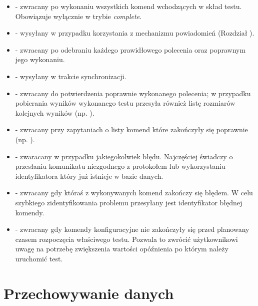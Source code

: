 \documentclass[00-praca-magisterska.tex]{subfiles}
\begin{document}
\begin{itemize}
  \setlength{\itemsep}{10pt}

\item{ - zwracany po wykonaniu wszystkich komend
wchodzących w skład testu. Obowiązuje wyłącznie w trybie \emph{complete}.}

\item{ - wysyłany w
przypadku korzystania z mechanizmu powiadomień (Rozdział ).}

\item{ - zwracany po odebraniu każdego prawidłowego polecenia oraz
poprawnym jego wykonaniu.}

\item{ - wysyłany w trakcie synchronizacji.}

\item{ - zwracany do potwierdzenia poprawnie wykonanego
polecenia; w przypadku pobierania wyników wykonanego testu przesyła również
listę rozmiarów kolejnych wyników (np. ).}

\item{ - zwracany przy zapytaniach o listy
komend które zakończyły się poprawnie (np. ).}

\item{ - zwaracany w przypadku jakiegokolwiek błędu. Najczęściej
świadczy o przesłaniu komunikatu niezgodnego z protokołem lub wykorzystaniu
identyfikatora który już istnieje w bazie danych.}

\item{ - zwracany gdy któraś z wykonywanych
komend zakończy się błędem. W celu szybkiego zidentyfikowania problemu
przesyłany jest identyfikator błędnej komendy.}

\item{ - zwracany gdy komendy konfiguracyjne nie zakończyły
się przed planowany czasem rozpoczęcia właściwego testu. Pozwala to zwrócić
użytkownikowi uwagę na potrzebę zwiększenia wartości opóźnienia po którym
należy uruchomić test.}

\end{itemize}

\section{Przechowywanie danych}
\label{arete-slave-db}
\end{document}
